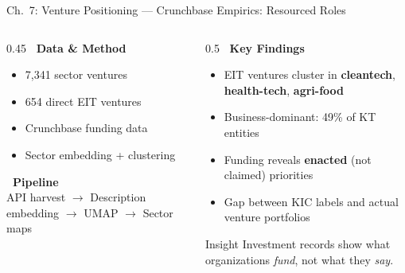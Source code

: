 \documentclass[aspectratio=169]{beamer}
\newcommand{\secmark}[1]{\hfill{\scriptsize\color{gray}#1}}
\begin{document}
\begin{frame}{Ch.~7: Venture Positioning --- Crunchbase}
\secmark{Empirics: Resourced Roles}
\begin{columns}[T]
\begin{column}{0.45\textwidth}
    \textbf{\faDatabase\ Data \& Method}
    \begin{itemize}
        \item 7,341 sector ventures
        \item 654 direct EIT ventures
        \item Crunchbase funding data
        \item Sector embedding + clustering
    \end{itemize}
    \vspace{0.5em}
    \textbf{\faCogs\ Pipeline}\\
    {\small API harvest $\to$ Description embedding $\to$ UMAP $\to$ Sector maps}
\end{column}
\begin{column}{0.5\textwidth}
    \textbf{\faLightbulb[regular]\ Key Findings}
    \begin{itemize}
        \item EIT ventures cluster in \textbf{cleantech}, \textbf{health-tech}, \textbf{agri-food}
        \item Business-dominant: 49\% of KT entities
        \item Funding reveals \textbf{enacted} (not claimed) priorities
        \item Gap between KIC labels and actual venture portfolios
    \end{itemize}
    \vspace{0.3em}
    \begin{block}{\scriptsize Insight}
        \scriptsize Investment records show what organizations \emph{fund}, not what they \emph{say}.
    \end{block}
\end{column}
\end{columns}
\end{frame}
\end{document}
